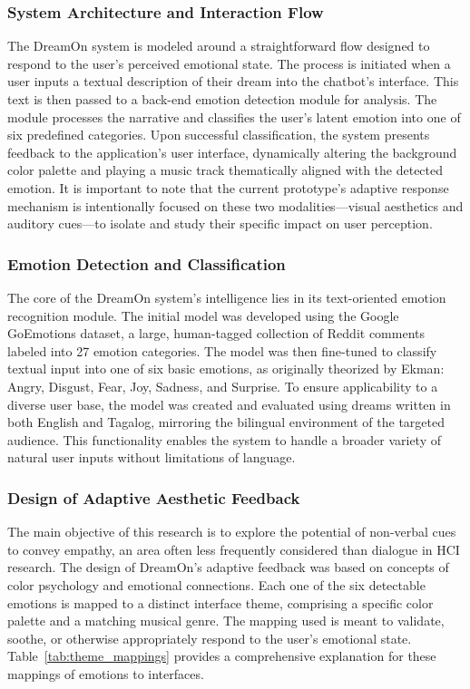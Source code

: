 \documentclass[conference]{IEEEtran}
\begin{document}
	\subsubsection{System Architecture and Interaction Flow}
	The DreamOn system is modeled around a straightforward flow designed to respond to the user's perceived emotional state. The process is initiated when a user inputs a textual description of their dream into the chatbot's interface. This text is then passed to a back-end emotion detection module for analysis. The module processes the narrative and classifies the user's latent emotion into one of six predefined categories. Upon successful classification, the system presents feedback to the application's user interface, dynamically altering the background color palette and playing a music track thematically aligned with the detected emotion. It is important to note that the current prototype's adaptive response mechanism is intentionally focused on these two modalities—visual aesthetics and auditory cues—to isolate and study their specific impact on user perception.
	
	\subsubsection{Emotion Detection and Classification}
	The core of the DreamOn system's intelligence lies in its text-oriented emotion recognition module. The initial model was developed using the Google GoEmotions dataset, a large, human-tagged collection of Reddit comments labeled into 27 emotion categories. The model was then fine-tuned to classify textual input into one of six basic emotions, as originally theorized by Ekman: Angry, Disgust, Fear, Joy, Sadness, and Surprise. To ensure applicability to a diverse user base, the model was created and evaluated using dreams written in both English and Tagalog, mirroring the bilingual environment of the targeted audience. This functionality enables the system to handle a broader variety of natural user inputs without limitations of language.
	
	\subsubsection{Design of Adaptive Aesthetic Feedback}
	The main objective of this research is to explore the potential of non-verbal cues to convey empathy, an area often less frequently considered than dialogue in HCI research. The design of DreamOn's adaptive feedback was based on concepts of color psychology and emotional connections. Each one of the six detectable emotions is mapped to a distinct interface theme, comprising a specific color palette and a matching musical genre. The mapping used is meant to validate, soothe, or otherwise appropriately respond to the user's emotional state. Table~\ref{tab:theme_mappings} provides a comprehensive explanation for these mappings of emotions to interfaces.
	
\end{document}
